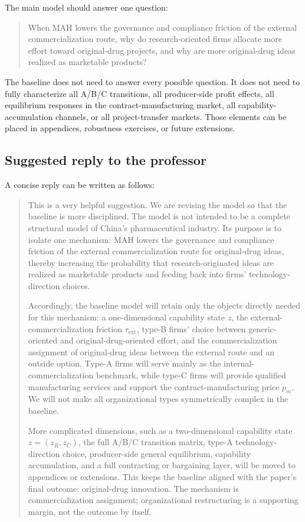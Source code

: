 \documentclass[12pt]{article}
\newcommand{\tauext}{\tau_{\mathrm{ext}}}
\begin{document}
The main model should answer one question:
\begin{quote}
When MAH lowers the governance and compliance friction of the external commercialization route, why do research-oriented firms allocate more effort toward original-drug projects, and why are more original-drug ideas realized as marketable products?
\end{quote}

The baseline does not need to answer every possible question. It does not need to fully characterize all A/B/C transitions, all producer-side profit effects, all equilibrium responses in the contract-manufacturing market, all capability-accumulation channels, or all project-transfer markets. Those elements can be placed in appendices, robustness exercises, or future extensions.

\subsection{Suggested reply to the professor}

A concise reply can be written as follows:

\begin{quote}
This is a very helpful suggestion. We are revising the model so that the baseline is more disciplined. The model is not intended to be a complete structural model of China's pharmaceutical industry. Its purpose is to isolate one mechanism: MAH lowers the governance and compliance friction of the external commercialization route for original-drug ideas, thereby increasing the probability that research-originated ideas are realized as marketable products and feeding back into firms' technology-direction choices.

Accordingly, the baseline model will retain only the objects directly needed for this mechanism: a one-dimensional capability state $z$, the external-commercialization friction $\tauext$, type-B firms' choice between generic-oriented and original-drug-oriented effort, and the commercialization assignment of original-drug ideas between the external route and an outside option. Type-A firms will serve mainly as the internal-commercialization benchmark, while type-C firms will provide qualified manufacturing services and support the contract-manufacturing price $p_m$. We will not make all organizational types symmetrically complex in the baseline.

More complicated dimensions, such as a two-dimensional capability state $z=(z_R,z_C)$, the full A/B/C transition matrix, type-A technology-direction choice, producer-side general equilibrium, capability accumulation, and a full contracting or bargaining layer, will be moved to appendices or extensions. This keeps the baseline aligned with the paper's final outcome: original-drug innovation. The mechanism is commercialization assignment; organizational restructuring is a supporting margin, not the outcome by itself.
\end{quote}
\end{document}
